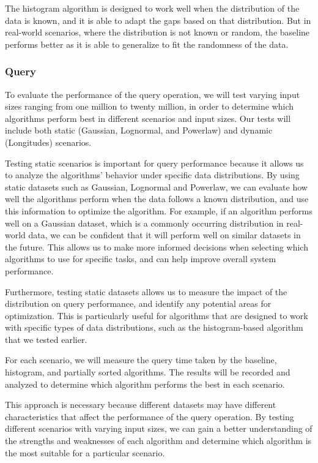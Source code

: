 \documentclass[11pt,a4paper]{article}
\begin{document}
The histogram algorithm is designed to work well when the distribution of the data is known, and it is able to adapt the gaps based on that distribution. But in real-world scenarios, where the distribution is not known or random, the baseline performs better as it is able to generalize to fit the randomness of the data. 

\subsubsection{Query}
To evaluate the performance of the query operation, we will test varying input sizes ranging from one million to twenty million, in order to determine which algorithms perform best in different scenarios and input sizes. Our tests will include both static (Gaussian, Lognormal, and Powerlaw) and dynamic (Longitudes) scenarios.

Testing static scenarios is important for query performance because it allows us to analyze the algorithms' behavior under specific data distributions. By using static datasets such as Gaussian, Lognormal and Powerlaw, we can evaluate how well the algorithms perform when the data follows a known distribution, and use this information to optimize the algorithm. For example, if an algorithm performs well on a Gaussian dataset, which is a commonly occurring distribution in real-world data, we can be confident that it will perform well on similar datasets in the future. This allows us to make more informed decisions when selecting which algorithms to use for specific tasks, and can help improve overall system performance.

Furthermore, testing static datasets allows us to measure the impact of the distribution on query performance, and identify any potential areas for optimization. This is particularly useful for algorithms that are designed to work with specific types of data distributions, such as the histogram-based algorithm that we tested earlier.

For each scenario, we will measure the query time taken by the baseline, histogram, and partially sorted algorithms. The results will be recorded and analyzed to determine which algorithm performs the best in each scenario.

This approach is necessary because different datasets may have different characteristics that affect the performance of the query operation. By testing different scenarios with varying input sizes, we can gain a better understanding of the strengths and weaknesses of each algorithm and determine which algorithm is the most suitable for a particular scenario.
\end{document}
